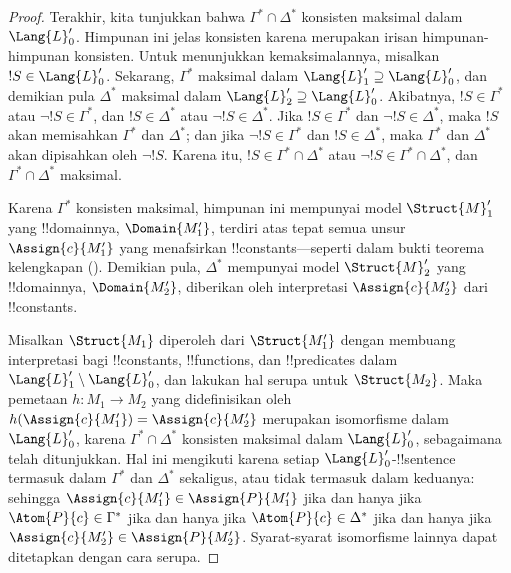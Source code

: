 \documentclass[../../../include/open-logic-section]{subfiles}
\begin{document}
\begin{proof}
Terakhir, kita tunjukkan bahwa $\Gamma^* \cap \Delta^*$ konsisten maksimal
dalam $\Lang{L}'_0$. Himpunan ini jelas konsisten karena merupakan irisan
himpunan-himpunan konsisten. Untuk menunjukkan kemaksimalannya, misalkan
$!S \in \Lang{L}'_0$. Sekarang, $\Gamma^*$ maksimal dalam $\Lang{L}'_1
\supseteq \Lang{L}'_0$, dan demikian pula $\Delta^*$ maksimal dalam
$\Lang{L}'_2 \supseteq \Lang{L}'_0$. Akibatnya, $!S \in \Gamma^*$ atau
$\lnot !S \in \Gamma^*$, dan $!S \in \Delta^*$ atau $\lnot !S \in
\Delta^*$. Jika $!S \in \Gamma^*$ dan $\lnot !S \in \Delta^*$, maka
$!S$ akan memisahkan $\Gamma^*$ dan $\Delta^*$; dan jika $\lnot !S \in
\Gamma^*$ dan $!S \in \Delta^*$, maka $\Gamma^*$ dan $\Delta^*$ akan
dipisahkan oleh $\lnot !S$. Karena itu, $!S \in \Gamma^* \cap \Delta^*$
atau $\lnot !S \in \Gamma^* \cap \Delta^*$, dan $\Gamma^* \cap
\Delta^*$ maksimal.

Karena $\Gamma^*$ konsisten maksimal, himpunan ini mempunyai model
$\Struct{M}'_1$ yang !!{domain}nya, $\Domain{M'_1}$, terdiri atas tepat
semua unsur $\Assign{c}{M'_1}$ yang menafsirkan !!{constant}s---seperti
dalam bukti teorema kelengkapan
(). Demikian pula, $\Delta^*$
mempunyai model $\Struct{M}'_2$ yang !!{domain}nya, $\Domain{M'_2}$,
diberikan oleh interpretasi $\Assign{c}{M'_2}$ dari !!{constant}s.

Misalkan $\Struct{M_1}$ diperoleh dari $\Struct{M'_1}$ dengan membuang
interpretasi bagi !!{constant}s, !!{function}s, dan !!{predicate}s dalam
$\Lang{L}'_1 \setminus \Lang{L}'_0$, dan lakukan hal serupa untuk
$\Struct{M_2}$. Maka pemetaan $h \colon M_1 \to M_2$ yang didefinisikan
oleh $h(\Assign{c}{M'_1}) = \Assign{c}{M'_2}$ merupakan isomorfisme dalam
$\Lang{L}'_0$, karena $\Gamma^* \cap \Delta^*$ konsisten maksimal dalam
$\Lang{L}'_0$, sebagaimana telah ditunjukkan. Hal ini mengikuti karena setiap
$\Lang{L}'_0$-!!{sentence} termasuk dalam $\Gamma^*$ dan $\Delta^*$
sekaligus, atau tidak termasuk dalam keduanya: sehingga
$\Assign{c}{M'_1} \in \Assign{P}{M'_1}$ jika dan hanya jika
$\Atom{P}{c} \in \Gamma^*$ jika dan hanya jika $\Atom{P}{c} \in
\Delta^*$ jika dan hanya jika $\Assign{c}{M'_2} \in \Assign{P}{M'_2}$.
Syarat-syarat isomorfisme lainnya dapat ditetapkan dengan cara serupa.


\end{proof}
\end{document}
